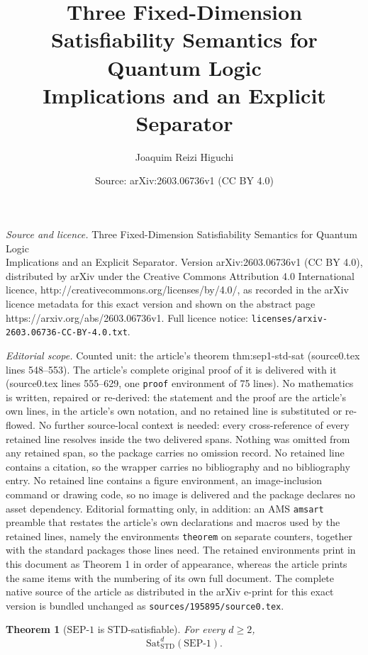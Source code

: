 \documentclass[10pt,a4paper]{amsart}
\title{Three Fixed-Dimension Satisfiability Semantics for Quantum Logic\\[0.35em] \large Implications and an Explicit Separator}
\author{Joaquim Reizi Higuchi}
\date{Source: arXiv:2603.06736v1 (CC BY 4.0)}
\newtheorem{theorem}{Theorem}
\newcommand{\SEPone}{\mathrm{SEP}\text{-}1}
\newcommand{\STD}{\mathrm{STD}}
\newcommand{\Sat}{\mathrm{Sat}}
\begin{document}
\maketitle

\noindent\emph{Source and licence.} Three Fixed-Dimension Satisfiability Semantics for Quantum Logic\\[0.35em] \large Implications and an Explicit Separator. Version arXiv:2603.06736v1 (CC BY 4.0), distributed by arXiv under the Creative Commons Attribution 4.0 International licence, http://creativecommons.org/licenses/by/4.0/, as recorded in the arXiv licence metadata for this exact version and shown on the abstract page https://arxiv.org/abs/2603.06736v1. Full licence notice: \texttt{licenses/arxiv-2603.06736-CC-BY-4.0.txt}.\par\smallskip

\noindent\textit{Editorial scope.} Counted unit: the article's theorem thm:sep1-std-sat (source0.tex lines 548--553). The article's complete original proof of it is delivered with it (source0.tex lines 555--629, one \texttt{proof} environment of 75 lines). No mathematics is written, repaired or re-derived: the statement and the proof are the article's own lines, in the article's own notation, and no retained line is substituted or re-flowed.  No further source-local context is needed: every cross-reference of every retained line resolves inside the two delivered spans.  Nothing was omitted from any retained span, so the package carries no omission record.  No retained line contains a citation, so the wrapper carries no bibliography and no bibliography entry.  No retained line contains a figure environment, an image-inclusion command or drawing code, so no image is delivered and the package declares no asset dependency.  Editorial formatting only, in addition: an AMS \texttt{amsart} preamble that restates the article's own declarations and macros used by the retained lines, namely the environments \texttt{theorem} on separate counters, together with the standard packages those lines need.  The retained environments print in this document as Theorem 1 in order of appearance, whereas the article prints the same items with the numbering of its own full document.  The complete native source of the article as distributed in the arXiv e-print for this exact version is bundled unchanged as \texttt{sources/195895/source0.tex}.
\begin{theorem}[\(\SEPone\) is STD-satisfiable]\label{thm:sep1-std-sat}
For every $d\geq 2$,
\[
\Sat_{\STD}^d(\SEPone).
\]
\end{theorem}
\end{document}
